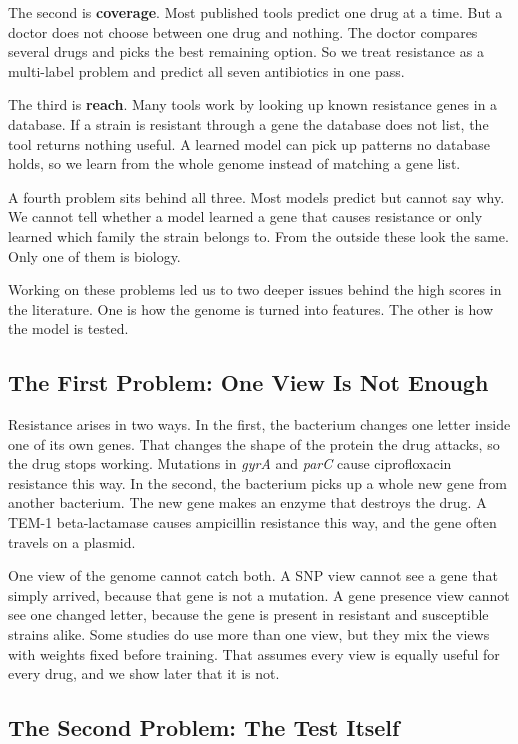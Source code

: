 \documentclass[conference]{IEEEtran}
\begin{document}
The second is \textbf{coverage}. Most published tools predict one drug at a time.
But a doctor does not choose between one drug and nothing. The doctor compares
several drugs and picks the best remaining option. So we treat resistance as a
multi-label problem and predict all seven antibiotics in one pass.

The third is \textbf{reach}. Many tools work by looking up known resistance genes
in a database. If a strain is resistant through a gene the database does not list,
the tool returns nothing useful. A learned model can pick up patterns no database
holds, so we learn from the whole genome instead of matching a gene list.

A fourth problem sits behind all three. Most models predict but cannot say why. We
cannot tell whether a model learned a gene that causes resistance or only learned
which family the strain belongs to. From the outside these look the same. Only one
of them is biology.

Working on these problems led us to two deeper issues behind the high scores in the
literature. One is how the genome is turned into features. The other is how the
model is tested.

\subsection{The First Problem: One View Is Not Enough}

Resistance arises in two ways. In the first, the bacterium changes one letter
inside one of its own genes. That changes the shape of the protein the drug
attacks, so the drug stops working. Mutations in \textit{gyrA} and \textit{parC}
cause ciprofloxacin resistance this way. In the second, the bacterium picks up a
whole new gene from another bacterium. The new gene makes an enzyme that destroys
the drug. A TEM-1 beta-lactamase causes ampicillin resistance this way, and the
gene often travels on a plasmid.

One view of the genome cannot catch both. A SNP view cannot see a gene that simply
arrived, because that gene is not a mutation. A gene presence view cannot see one
changed letter, because the gene is present in resistant and susceptible strains
alike. Some studies do use more than one view, but they mix the views with weights
fixed before training. That assumes every view is equally useful for every drug,
and we show later that it is not.

\subsection{The Second Problem: The Test Itself}
\end{document}
